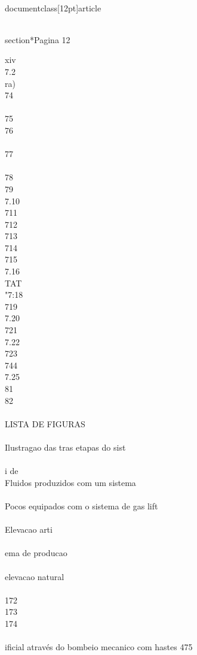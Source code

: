 \\documentclass[12pt]{article}
\begin{document}
\\section*{Pagina 12}

xiv\\
7.2\\
ra)\\
74\\
\\
75\\
76\\
\\
77\\
\\
78\\
79\\
7.10\\
711\\
712\\
713\\
714\\
715\\
7.16\\
TAT\\
"7:18\\
719\\
7.20\\
721\\
7.22\\
723\\
744\\
7.25\\
81\\
82\\
\\
LISTA DE FIGURAS\\
\\
Ilustragao das tras etapas do sist\\
\\
i de\\
Fluidos produzidos com um sistema\\
\\
Pocos equipados com o sistema de gas lift\\
\\
Elevacao arti\\
\\
ema de producao\\
\\
elevacao natural\\
\\
172\\
173\\
174\\
\\
ificial através do bombeio mecanico com hastes 475\\
\end{document}
